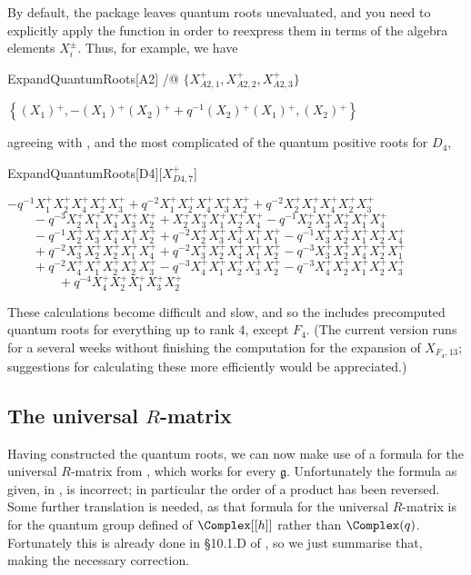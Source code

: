 By default, the  package leaves quantum roots unevaluated, and you need to explicitly apply the function 
in order to reexpress them in terms of the algebra elements $X_i^\pm$. Thus, for example, we have
\begin{mma}
\begin{inm}ExpandQuantumRoots[A2] /@ $\{ X_{A2,1}^+, X_{A2,2}^+, X_{A2,3}^+ \}$
\end{inm}
\begin{outm}$\left\{\left(X_1\right){}^+,-\left(X_1\right){}^+\left(X_2\right){}^+ + q^{-1}\left(X_2\right){}^+\left(X_1\right){}^+,\left(X_2\right){}^+\right\}$
\end{outm}
\end{mma}
agreeing with \cite[Example 8.1.5]{CP}, and the most complicated of the quantum positive roots for $D_4$,
\begin{mma}
\begin{inm}ExpandQuantumRoots[D4][$X_{D4,7}^+$]
\end{inm}
\begin{outm}$-q^{-1}X_1^+ X_2^+ X_4^+ X_2^+ X_3^+ + q^{-2}X_1^+ X_2^+ X_4^+ X_3^+ X_2^+ + q^{-2}X_2^+ X_1^+ X_4^+ X_2^+ X_3^+$
$\qquad  -q^{-3}X_2^+ X_1^+ X_4^+ X_3^+ X_2^+ +X_2^+ X_3^+ X_1^+ X_2^+ X_4^+ - q^{-1}X_2^+ X_3^+ X_2^+ X_1^+ X_4^+$
$\qquad  - q^{-1}X_2^+ X_3^+ X_4^+ X_1^+ X_2^+ + q^{-2}X_2^+ X_3^+ X_4^+ X_1^+ X_1^+ -q^{-1}X_3^+ X_2^+ X_1^+ X_2^+ X_4^+$
$\qquad + q^{-2}X_3^+ X_2^+ X_2^+ X_1^+ X_4^+ + q^{-2}X_3^+ X_2^+ X_4^+ X_1^+ X_2^+ -q^{-3}X_3^+ X_2^+ X_4^+ X_2^+ X_1^+$
$\qquad +q^{-2}X_4^+ X_1^+ X_2^+ X_2^+ X_3^+ - q^{-3}X_4^+ X_1^+ X_2^+ X_3^+ X_2^+ - q^{-3}X_4^+ X_2^+ X_1^+ X_2^+ X_3^+$
$\qquad \qquad + q^{-4}X_4^+ X_2^+ X_1^+ X_3^+ X_2^+$
\end{outm}
\end{mma}

These calculations become difficult and slow, and so the \pkg includes precomputed quantum roots for everything up to rank $4$, except $F_4$. (The current version runs
for a several weeks without finishing the computation for the expansion of $X_{F_4, 13}$; suggestions for calculating these more efficiently would be
appreciated.)

\subsection{The universal $R$-matrix}
Having constructed the quantum roots, we can now make use of a formula for the universal $R$-matrix from \cite{CP}, which works for every $\mathfrak{g}$.
Unfortunately the formula as given, in \cite[Theorem 8.3.9]{CP}, is incorrect; in particular the order of a product has been reversed.
Some further translation is needed, as that formula for the universal $R$-matrix is for the quantum group defined of $\Complex[[h]]$ rather than $\Complex(q)$.
Fortunately this is already done in \S10.1.D of \cite{CP}, so we just summarise that, making the necessary correction.

